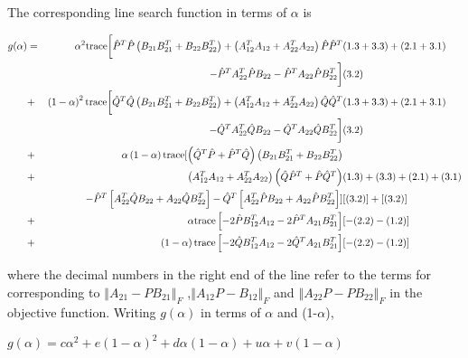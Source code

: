 \documentclass[12pt,oneside,final]{thesis}\usepackage[]{graphicx}\usepackage[]{color}
\begin{document}
\begin{flushleft}
The corresponding line search function in terms of $\alpha$ is
\par\end{flushleft}

\begin{flushleft}
\begin{align*}
g(\alpha) & = & \alpha^{2}  \textup{trace}\biggl[\hat{P}^{T}\hat{P}\left(B_{21}B_{21}^{T}+B_{22}B_{22}^{T}\right)+\left(A_{12}^{T}A_{12}+A_{22}^{T}A_{22}\right)\hat{P}\hat{P}^{T} & (1.3+3.3)+(2.1+3.1)\\
 &  &   -\hat{P}^{T}A_{22}^{T}\hat{P}B_{22}-\hat{P}^{T}A_{22}\hat{P}B_{22}^{T}\biggr] & (3.2)\\
 & + & \left(1-\alpha\right)^{2}  \textup{trace}\biggl[\hat{Q}^{T}\hat{Q}\left(B_{21}B_{21}^{T}+B_{22}B_{22}^{T}\right)+\left(A_{12}^{T}A_{12}+A_{22}^{T}A_{22}\right)\hat{Q}\hat{Q}^{T} &  (1.3+3.3)+(2.1+3.1)\\
 &  &   -\hat{Q}^{T}A_{22}^{T}\hat{Q}B_{22}-\hat{Q}^{T}A_{22}\hat{Q}B_{22}^{T}\biggr] & (3.2)\\
 & + & \alpha\left(1-\alpha\right)  \textup{trace}[\left(\hat{Q}^{T}\hat{P}+\hat{P}^{T}\hat{Q}\right)\left(B_{21}B_{21}^{T}+B_{22}B_{22}^{T}\right)& \\
 & + & \left(A_{12}^{T}A_{12}+A_{22}^{T}A_{22}\right)\left(\hat{Q}\hat{P}^{T}+\hat{P}\hat{Q}^{T}\right)& (1.3)+(3.3) +(2.1)+(3.1)\\
 &  & -\hat{P}^{T}\left[A_{22}^{T}\hat{Q}B_{22}+A_{22}\hat{Q}B_{22}^{T}\right]-\hat{Q}^{T}\left[A_{22}^{T}\hat{P}B_{22}+A_{22}\hat{P}B_{22}^{T}\right]] & [(3.2)]+[(3.2)]\\
 & + & \alpha  \textup{trace}\left[-2\hat{P}B_{12}^{T}A_{12}-2\hat{P}^{T}A_{21}B_{21}^{T}\right] & [-(2.2)-(1.2)]\\
 & + & \left(1-\alpha\right)  \textup{trace}\left[-2\hat{Q}B_{12}^{T}A_{12}-2\hat{Q}^{T}A_{21}B_{21}^{T}\right] & [-(2.2)-(1.2)]
\end{align*}

\par\end{flushleft}

where the decimal numbers in the right end of the line refer to the
terms for corresponding to $\left\Vert A_{21}-PB_{21}\right\Vert _{F}$
,$\left\Vert A_{12}P-B_{12}\right\Vert _{F}$ and $\left\Vert A_{22}P-PB_{22}\right\Vert _{F}$
in the objective function. Writing $g\left(\alpha\right)$ in terms
of $\alpha$ and (1-$\alpha$),

$g\left(\alpha\right)=c\alpha^{2}+e(1-\alpha)^{2}+d\alpha(1-\alpha)+u\alpha+v(1-\alpha)$
\end{document}
